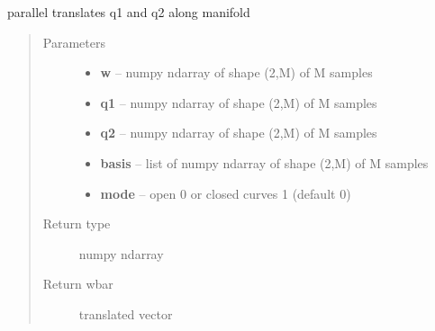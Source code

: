 \documentclass[letterpaper,10pt,english]{sphinxmanual}
\begin{document}
\begin{fulllineitems}
\label{curve_functions:curve_functions.parallel_translate}
parallel translates q1 and q2 along manifold
\begin{quote}\begin{description}
\item[{Parameters}] \leavevmode\begin{itemize}
\item {} 
\textbf{w} -- numpy ndarray of shape (2,M) of M samples

\item {} 
\textbf{q1} -- numpy ndarray of shape (2,M) of M samples

\item {} 
\textbf{q2} -- numpy ndarray of shape (2,M) of M samples

\item {} 
\textbf{basis} -- list of numpy ndarray of shape (2,M) of M samples

\item {} 
\textbf{mode} -- open 0 or closed curves 1 (default 0)

\end{itemize}

\item[{Return type}] \leavevmode
numpy ndarray

\item[{Return wbar}] \leavevmode
translated vector

\end{description}\end{quote}

\end{fulllineitems}

\end{document}

